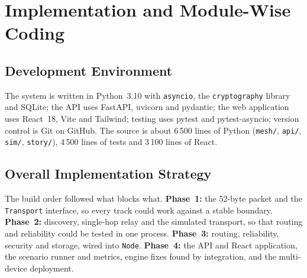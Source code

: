 \section{Implementation and Module-Wise Coding}
\label{ch:impl}

\subsection{Development Environment}
The system is written in Python~3.10 with \texttt{asyncio}, the \texttt{cryptography} library and SQLite; the API uses FastAPI, uvicorn and pydantic; the web application uses React~18, Vite and Tailwind; testing uses pytest and pytest-asyncio; version control is Git on GitHub. The source is about 6\,500 lines of Python (\texttt{mesh/}, \texttt{api/}, \texttt{sim/}, \texttt{story/}), 4\,500 lines of tests and 3\,100 lines of React.

\subsection{Overall Implementation Strategy}
The build order followed what blocks what. \textbf{Phase~1:} the 52-byte packet and the \texttt{Transport} interface, so every track could work against a stable boundary. \textbf{Phase~2:} discovery, single-hop relay and the simulated transport, so that routing and reliability could be tested in one process. \textbf{Phase~3:} routing, reliability, security and storage, wired into \texttt{Node}. \textbf{Phase~4:} the API and React application, the scenario runner and metrics, engine fixes found by integration, and the multi-device deployment.

